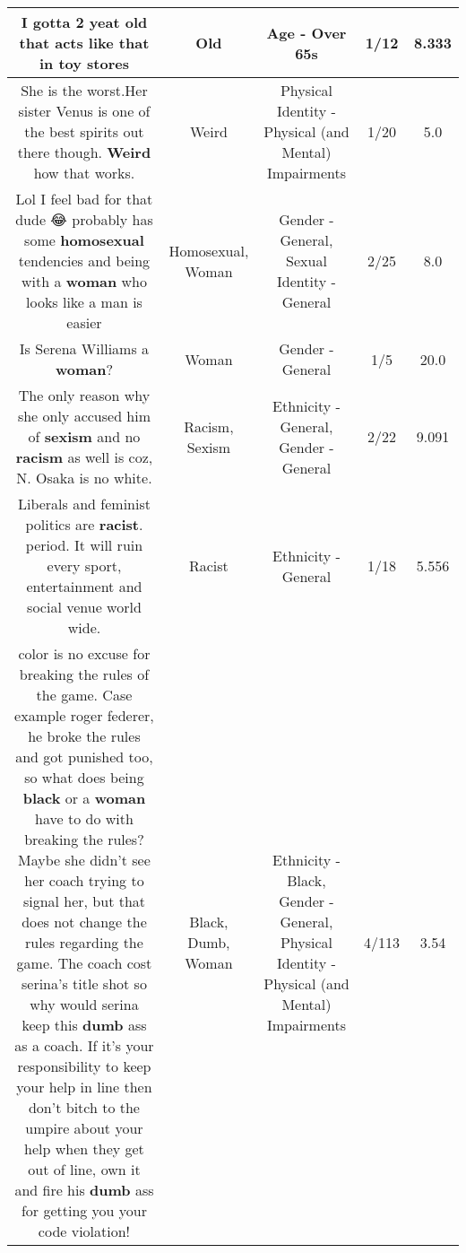 \documentclass[11pt]{article}
\newlength\mylength
\begin{document}
\begin{center}
\begin{longtable}{|C{.65\mylength}|C{.30\mylength}|C{.12\mylength}|C{.12\mylength}|C{.12\mylength}|}
  \small I gotta 2 yeat \textbf{old} that acts like that in toy stores\normalsize   & Old & Age - Over 65s & 1/12 & 8.333 \\  \hline
  \small She is the worst.Her sister Venus is one of the best spirits out there though.  \textbf{Weird} how that works.\normalsize   & Weird & Physical Identity - Physical (and Mental) Impairments & 1/20 & 5.0 \\  \hline
  \small Lol I feel bad for that dude 😂 probably has some \textbf{homosexual} tendencies and being with a \textbf{woman} who looks like a man is easier\normalsize   & Homosexual, Woman & Gender - General, Sexual Identity - General & 2/25 & 8.0 \\  \hline
  \small Is Serena Williams a \textbf{woman}?\normalsize   & Woman & Gender - General & 1/5 & 20.0 \\  \hline
  \small The only reason why she only accused him of \textbf{sexism} and no \textbf{racism} as well is coz, N. Osaka is no white.\normalsize   & Racism, Sexism & Ethnicity - General, Gender - General & 2/22 & 9.091 \\  \hline
  \small Liberals and feminist politics are \textbf{racist}. period. It will ruin every sport, entertainment and social venue world wide.\normalsize   & Racist & Ethnicity - General & 1/18 & 5.556 \\  \hline
  \small color is no excuse for breaking the rules of the game. Case example roger federer, he broke the rules and got punished too, so what does being \textbf{black} or a \textbf{woman} have to do with breaking the rules? Maybe she didn't see her coach trying to signal her, but that does not change the rules regarding the game. The coach cost serina's title shot so why would serina keep this \textbf{dumb} ass as a coach. If it's your responsibility to keep your help in line then don't bitch to the umpire about your help when they get out of line, own it and fire his \textbf{dumb} ass for getting you your code violation!\normalsize   & Black, Dumb, Woman & Ethnicity - Black, Gender - General, Physical Identity - Physical (and Mental) Impairments & 4/113 & 3.54 \\  \hline

\end{longtable}
\end{center}
\end{document}
